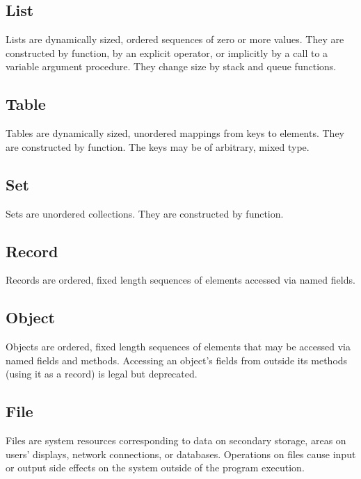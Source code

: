 \subsection*{List}

Lists are dynamically sized, ordered sequences of zero or
more values. They are constructed by function, by an explicit
operator, or implicitly by a call to a variable argument procedure.
They change size by stack and queue functions.

\subsection*{Table}

Tables are dynamically sized, unordered mappings from keys
to elements. They are constructed by function. The keys may be of
arbitrary, mixed type.

\subsection*{Set}

Sets are unordered collections. They are constructed by function.

\subsection*{Record}

Records are ordered, fixed length sequences of elements
accessed via named fields.

\subsection*{Object}

Objects are ordered, fixed length sequences of elements that may
be accessed via named fields and methods. Accessing an object's fields from
outside its methods (using it as a record) is legal but deprecated.

\subsection*{File}

Files are system resources corresponding to data on secondary
storage, areas on users' displays, network connections, or
databases. Operations on files cause input or output side
effects on the system outside of the program execution.

